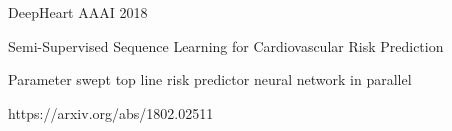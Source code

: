 



\begin{cvpublications}

\cvpublication
{DeepHeart}
{AAAI 2018}
{
Semi-Supervised Sequence Learning for Cardiovascular Risk Prediction
\begin{cvitems}
\item[]
\item {Parameter swept top line risk predictor neural network in parallel}
\end{cvitems}
}
{https://arxiv.org/abs/1802.02511}

\end{cvpublications}
